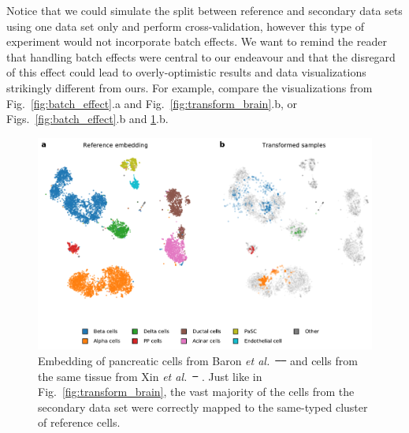 \documentclass[runningheads]{llncs}
\newcommand{\etal}{\textit{et al.}}
\providecommand{\DIFaddtex}[1]{{\protect\color{blue}\uwave{#1}}} %
\providecommand{\DIFdeltex}[1]{{\protect\color{red}\sout{#1}}}                      %
\providecommand{\DIFaddFL}[1]{\DIFadd{#1}} %
\providecommand{\DIFdelFL}[1]{\DIFdel{#1}} %
\providecommand{\DIFaddbeginFL}{} %
\providecommand{\DIFaddendFL}{} %
\providecommand{\DIFdelbeginFL}{} %
\providecommand{\DIFdelendFL}{} %
\providecommand{\DIFadd}[1]{\texorpdfstring{\DIFaddtex{#1}}{#1}} %
\providecommand{\DIFdel}[1]{\texorpdfstring{\DIFdeltex{#1}}{}} %
\newcommand{\DIFscaledelfig}{0.5}
\newlength{\DIFdelgraphicswidth} %
\newlength{\DIFdelgraphicsheight} %
\newcommand{\DIFaddincludegraphics}[2][]{{\color{blue}\fbox{\DIFOincludegraphics[#1]{#2}}}} %
\newcommand{\DIFdelincludegraphics}[2][]{%
\sbox{\DIFdelgraphicsbox}{\DIFOincludegraphics[#1]{#2}}%
\settoboxwidth{\DIFdelgraphicswidth}{\DIFdelgraphicsbox} %
\settoboxtotalheight{\DIFdelgraphicsheight}{\DIFdelgraphicsbox} %
\scalebox{\DIFscaledelfig}{%
\parbox[b]{\DIFdelgraphicswidth}{\usebox{\DIFdelgraphicsbox}\\[-\baselineskip] \rule{\DIFdelgraphicswidth}{0em}}\llap{\resizebox{\DIFdelgraphicswidth}{\DIFdelgraphicsheight}{%
\setlength{\unitlength}{\DIFdelgraphicswidth}%
\begin{picture}(1,1)%
\thicklines\linethickness{2pt} %
{\color[rgb]{1,0,0}\put(0,0){\framebox(1,1){}}}%
{\color[rgb]{1,0,0}\put(0,0){\line( 1,1){1}}}%
{\color[rgb]{1,0,0}\put(0,1){\line(1,-1){1}}}%
\end{picture}%
}\hspace*{3pt}}} %
} %
\DeclareRobustCommand{\DIFaddbeginFL}{\DIFOaddbeginFL \let\includegraphics\DIFaddincludegraphics} %
\DeclareRobustCommand{\DIFaddendFL}{\DIFOaddendFL \let\includegraphics\DIFOincludegraphics} %
\DeclareRobustCommand{\DIFdelbeginFL}{\DIFOdelbeginFL \let\includegraphics\DIFdelincludegraphics} %
\DeclareRobustCommand{\DIFdelendFL}{\DIFOaddendFL \let\includegraphics\DIFOincludegraphics} %
\begin{document}
Notice that we could simulate the split between reference and secondary data
sets using one data set only and perform cross-validation, however this type of
experiment would not incorporate batch effects. We want to remind the reader
that handling batch effects were central to our endeavour and that the
disregard of this effect could lead to overly-optimistic results and data
visualizations strikingly different from ours. For example, compare the
visualizations from Fig.~\ref{fig:batch_effect}.a and
Fig.~\ref{fig:transform_brain}.b, or Figs.~\ref{fig:batch_effect}.b and
\ref{fig:transform_pancreas}.b.


\begin{figure}[htb]
  \includegraphics[width=\textwidth]{transform_pancreas.pdf}
  \caption{Embedding of pancreatic cells from Baron \etal~\DIFdelbeginFL \DIFdelFL{\mbox{%
\cite{baron2016} }\hspace{0pt}%
}\DIFdelendFL \DIFaddbeginFL \DIFaddFL{\mbox{%
\cite{Baron2016} }\hspace{0pt}%
}\DIFaddendFL and
  cells from the same tissue from Xin \etal~\DIFdelbeginFL \DIFdelFL{\mbox{%
\cite{xin2016}}\hspace{0pt}%
}\DIFdelendFL \DIFaddbeginFL \DIFaddFL{\mbox{%
\cite{Xin2016}}\hspace{0pt}%
}\DIFaddendFL . Just like in
  Fig.~\ref{fig:transform_brain}, the vast majority of the cells from the
  secondary data set were correctly mapped to the same-typed cluster of
  reference cells.}
  \label{fig:transform_pancreas}
\end{figure}
\end{document}

